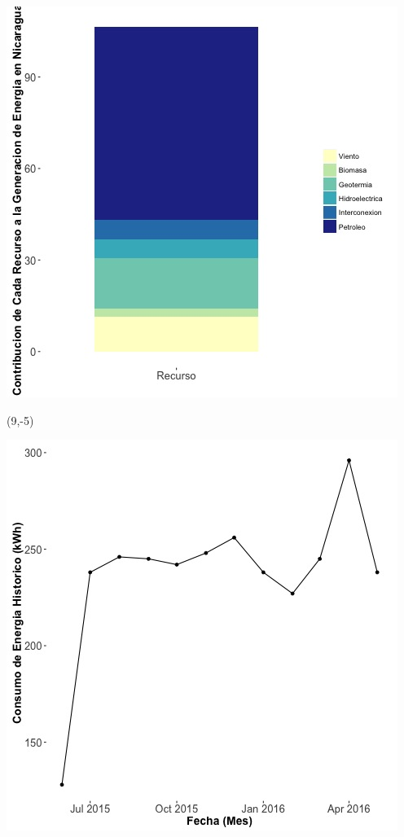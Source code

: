 \documentclass{article}\usepackage[]{graphicx}\usepackage[]{color}
\newenvironment{knitrout}{}{} %
\begin{document}
\begin{knitrout}
\color{fgcolor}
\includegraphics[scale=0.65]{figure/gridplot2.jpg} 
\end{knitrout}

 \begin{textblock}{1}(9,-5)
\begin{minipage}{20em}
\begingroup

\endgroup
\end{minipage}
\end{textblock}

\begin{knitrout}
\color{fgcolor}
\includegraphics[scale=0.65]{figure/A28_historico_energia} 
\end{knitrout}
\end{document}
